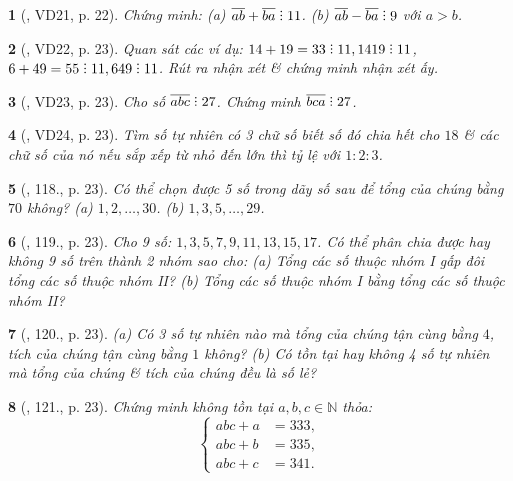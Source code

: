 \documentclass{article}
\newtheorem{baitoan}{}
\DeclareRobustCommand{\divby}{%
	\mathrel{\vbox{\baselineskip.65ex\lineskiplimit0pt\hbox{.}\hbox{.}\hbox{.}}}%
}
\begin{document}
\begin{baitoan}[\cite{Binh_Toan_6_tap_1}, VD21, p. 22]
	Chứng minh: (a) $\overline{ab} + \overline{ba}\divby11$. (b) $\overline{ab} - \overline{ba}\divby9$ với $a > b$.
\end{baitoan}

\begin{baitoan}[\cite{Binh_Toan_6_tap_1}, VD22, p. 23]
	Quan sát các ví dụ: $14 + 19 = 33\divby11,1419\divby11$, $6 + 49 = 55\divby11,649\divby11$. Rút ra nhận xét \& chứng minh nhận xét ấy.
\end{baitoan}

\begin{baitoan}[\cite{Binh_Toan_6_tap_1}, VD23, p. 23]
	Cho số $\overline{abc}\divby27$. Chứng minh $\overline{bca}\divby27$.
\end{baitoan}

\begin{baitoan}[\cite{Binh_Toan_6_tap_1}, VD24, p. 23]
	Tìm số tự nhiên có 3 chữ số biết số đó chia hết cho $18$ \& các chữ số của nó nếu sắp xếp từ nhỏ đến lớn thì tỷ lệ với $1:2:3$.
\end{baitoan}

\begin{baitoan}[\cite{Binh_Toan_6_tap_1}, 118., p. 23]
	Có thể chọn được 5 số trong dãy số sau để tổng của chúng bằng $70$ không? (a) $1,2,\ldots,30$. (b) $1,3,5,\ldots,29$.
\end{baitoan}

\begin{baitoan}[\cite{Binh_Toan_6_tap_1}, 119., p. 23]
	Cho 9 số: $1,3,5,7,9,11,13,15,17$. Có thể phân chia được hay không 9 số trên thành 2 nhóm sao cho: (a) Tổng các số thuộc nhóm I gấp đôi tổng các số thuộc nhóm II? (b) Tổng các số thuộc nhóm I bằng tổng các số thuộc nhóm II?
\end{baitoan}

\begin{baitoan}[\cite{Binh_Toan_6_tap_1}, 120., p. 23]
	(a) Có 3 số tự nhiên nào mà tổng của chúng tận cùng bằng $4$, tích của chúng tận cùng bằng $1$ không? (b) Có tồn tại hay không 4 số tự nhiên mà tổng của chúng \& tích của chúng đều là số lẻ?
\end{baitoan}

\begin{baitoan}[\cite{Binh_Toan_6_tap_1}, 121., p. 23]
	Chứng minh không tồn tại $a,b,c\in\mathbb{N}$ thỏa:
	\begin{equation*}
		\left\{\begin{split}
			abc + a &= 333,\\
			abc + b &= 335,\\
			abc + c &= 341.
		\end{split}\right.
	\end{equation*}
\end{baitoan}
\end{document}
